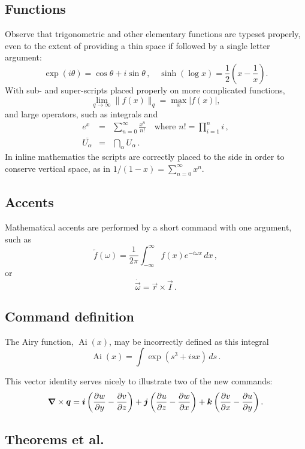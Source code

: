 \documentclass[9pt]{memoir}
\begin{document}
\subsection{Functions}

Observe that trigonometric and other elementary functions are typeset 
properly, even to the extent of providing a thin space if followed by 
a single letter argument:
\[
	\exp(i\theta)=\cos\theta +i\sin\theta\,,\quad
	\sinh(\log x)=\frac{1}{2}\left( x-\frac{1}{x} \right).
\]
With sub- and super-scripts placed properly on more complicated 
functions,
\[
	\lim_{q\to\infty}\|f(x)\|_q 
	=\max_{x}|f(x)|,
\]
and large operators, such as integrals and
\begin{eqnarray*}
	e^x & = & \sum_{n=0}^\infty \frac{x^n}{n!}
	\quad\text{where }n!=\prod_{i=1}^n i\,,  \\
	\overline{U_\alpha} & = & \bigcap_\alpha U_\alpha\,.
\end{eqnarray*}
In inline mathematics the scripts are correctly placed to the side in 
order to conserve vertical space, as in
\(
	1/(1-x)=\sum_{n=0}^\infty x^n.
\)

\subsection{Accents}

Mathematical accents are performed by a short command with one 
argument, such as
\[
	\tilde f(\omega)=\frac{1}{2\pi}
	\int_{-\infty}^\infty f(x)e^{-i\omega x}\,dx\,,
\]
or
\[
	\dot{\vec \omega}=\vec r\times\vec I\,.
\]

\subsection{Command definition}

\newcommand{\Ai}{\operatorname{Ai}} 
The Airy function, $\Ai(x)$, may be incorrectly defined as this 
integral
\[
	\Ai(x)=\int\exp(s^3+isx)\,ds\,.
\]

\newcommand{\D}[2]{\frac{\partial #2}{\partial #1}}
\newcommand{\DD}[2]{\frac{\partial^2 #2}{\partial #1^2}}
\renewcommand{\vec}[1]{\text{\boldmath$#1$}}

This vector identity serves nicely to illustrate two of the new 
commands:
\[
	\vec\nabla\times\vec q
	=\vec i\left(\D yw-\D zv\right)
	+\vec j\left(\D zu-\D xw\right)
	+\vec k\left(\D xv-\D yu\right).
\]


\subsection{Theorems et al.}
\end{document}
